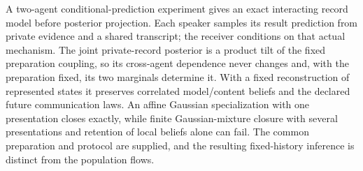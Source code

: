 A two-agent conditional-prediction experiment gives an exact interacting record model before posterior projection. Each speaker samples its result prediction from private evidence and a shared transcript; the receiver conditions on that actual mechanism. The joint private-record posterior is a product tilt of the fixed preparation coupling, so its cross-agent dependence never changes and, with the preparation fixed, its two marginals determine it. With a fixed reconstruction of represented states it preserves correlated model/content beliefs and the declared future communication laws. An affine Gaussian specialization with one presentation closes exactly, while finite Gaussian-mixture closure with several presentations and retention of local beliefs alone can fail. The common preparation and protocol are supplied, and the resulting fixed-history inference is distinct from the population flows.

